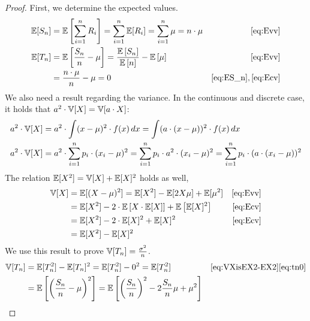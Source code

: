 \begin{proof}
  First, we determine the expected values.
  \begin{align}
      \mathbb E[S_n] &= \mathbb E\left[\sum_{i=1}^n R_i\right] = \sum_{i=1}^n \mathbb E[R_i] = \sum_{i=1}^n \mu = n \cdot \mu & \eqref{eq:Evv} \label{eq:ES_n} \\
      \mathbb E[T_n] &= \mathbb E\left[\frac{S_n}{n} - \mu\right] = \frac{\mathbb E\left[S_n\right]}{\mathbb E\left[n\right]} - \mathbb E\left[\mu\right] & \eqref{eq:Evv} \notag\\
              &= \frac{n \cdot \mu}{n} - \mu = 0  & \eqref{eq:ES_n}, \eqref{eq:Ecv} \label{eq:tn0}
  \end{align}
  We also need a result regarding the variance.
  In the continuous and discrete case, it holds that $a^2 \cdot \mathbb V[X] = \mathbb V[a \cdot X]$:
  \begin{align}
    a^2 \cdot \mathbb V[X] &= a^2 \cdot \int (x - \mu)^2 \cdot f(x) \, dx = \int (a \cdot (x - \mu))^2 \cdot f(x) \, dx \notag \\
    a^2 \cdot \mathbb V[X] &= a^2 \cdot \sum_{i=1}^n p_i \cdot (x_i - \mu)^2 = \sum_{i=1}^n p_i \cdot a^2 \cdot (x_i - \mu)^2 = \sum_{i=1}^n p_i \cdot (a \cdot (x_i - \mu))^2 \label{eq:a2V}
  \end{align}
  The relation $\mathbb E[X^2] = \mathbb V[X] + \mathbb E[X]^2$ holds as well,
  \begin{align}
    \mathbb V[X] &= \mathbb E[(X - \mu)^2] = \mathbb E[X^2] - \mathbb E[2X\mu] + \mathbb E[\mu^2] \notag & \eqref{eq:Evv} \\
            &= \mathbb E[X^2] - 2 \cdot \mathbb E\left[X \cdot \mathbb E[X]\right] + \mathbb E\left[\mathbb E[X]^2\right] & \eqref{eq:Ecv} \notag\\
            &= \mathbb E[X^2] - 2 \cdot \mathbb E[X]^2 + \mathbb E[X]^2 & \eqref{eq:Ecv} \notag\\
            &= \mathbb E[X^2] - \mathbb E[X]^2 \label{eq:VXisEX2-EX2}
  \end{align}
  We use this result to prove $\mathbb V[T_n] = \frac{\sigma^2}{n}$.
  \begin{align}
    \Var[T_n] &= \E[T_n^2] - \E[T_n]^2 = \E[T_n^2] - 0^2 = \E[T_n^2] & \eqref{eq:VXisEX2-EX2} \eqref{eq:tn0} \label{eq:EVT_n}\\
              &= \E\left[\left(\frac{S_n}{n} - \mu\right)^2\right] = \E\left[\left(\frac{S_n}{n}\right)^2 - 2\frac{S_n}{n}\mu + \mu^2\right] \notag \\

\end{align}
\end{proof}
